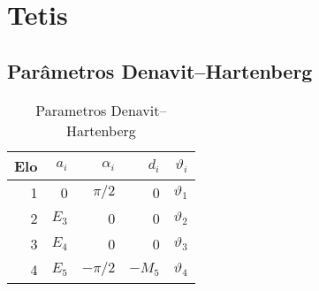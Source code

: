 \chapter{Tetis}

\section{Parâmetros Denavit–Hartenberg}
\begin{table}[!ht]
\centering
\caption{Parametros Denavit–Hartenberg}
\label{my-label}
\begin{tabular}{rrrrr} \hline
Elo & $a_i$ & $\alpha_i$ & $d_i$  & $\vartheta_i$ \\ \hline
1   & 0     & $\pi/2$    & 0      & $\vartheta_1$ \\
2   & $E_3$ & 0          & 0      & $\vartheta_2$ \\
3   & $E_4$ & 0          & 0      & $\vartheta_3$ \\
4   & $E_5$ & $-\pi/2$   & $-M_5$ & $\vartheta_4$ \\ \hline
\end{tabular}
\end{table}

